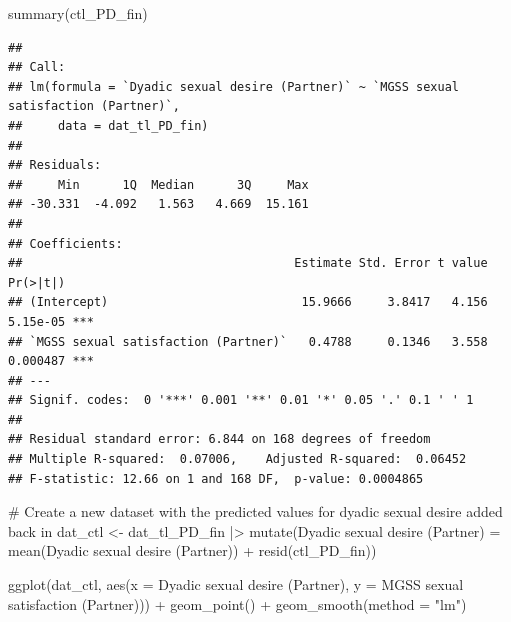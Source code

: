 \documentclass[
  bookmarksnumbered]{article}
\newenvironment{Shaded}{\begin{snugshade}}{\end{snugshade}}
\newcommand{\AttributeTok}[1]{\textcolor[rgb]{0.80,0.80,0.80}{#1}}
\newcommand{\CommentTok}[1]{\textcolor[rgb]{0.50,0.62,0.50}{#1}}
\newcommand{\FunctionTok}[1]{\textcolor[rgb]{0.94,0.94,0.56}{#1}}
\newcommand{\NormalTok}[1]{\textcolor[rgb]{0.80,0.80,0.80}{#1}}
\newcommand{\OtherTok}[1]{\textcolor[rgb]{0.94,0.94,0.56}{#1}}
\newcommand{\SpecialCharTok}[1]{\textcolor[rgb]{0.86,0.64,0.64}{#1}}
\newcommand{\StringTok}[1]{\textcolor[rgb]{0.80,0.58,0.58}{#1}}
\begin{document}
\begin{Shaded}
\begin{Highlighting}[]
\FunctionTok{summary}\NormalTok{(ctl\_PD\_fin)}
\end{Highlighting}
\end{Shaded}

\begin{verbatim}
## 
## Call:
## lm(formula = `Dyadic sexual desire (Partner)` ~ `MGSS sexual satisfaction (Partner)`, 
##     data = dat_tl_PD_fin)
## 
## Residuals:
##     Min      1Q  Median      3Q     Max 
## -30.331  -4.092   1.563   4.669  15.161 
## 
## Coefficients:
##                                      Estimate Std. Error t value Pr(>|t|)    
## (Intercept)                           15.9666     3.8417   4.156 5.15e-05 ***
## `MGSS sexual satisfaction (Partner)`   0.4788     0.1346   3.558 0.000487 ***
## ---
## Signif. codes:  0 '***' 0.001 '**' 0.01 '*' 0.05 '.' 0.1 ' ' 1
## 
## Residual standard error: 6.844 on 168 degrees of freedom
## Multiple R-squared:  0.07006,    Adjusted R-squared:  0.06452 
## F-statistic: 12.66 on 1 and 168 DF,  p-value: 0.0004865
\end{verbatim}

\begin{Shaded}
\begin{Highlighting}[]
\CommentTok{\# Create a new dataset with the predicted values for dyadic sexual desire added back in}
\NormalTok{dat\_ctl }\OtherTok{\textless{}{-}}\NormalTok{ dat\_tl\_PD\_fin }\SpecialCharTok{|\textgreater{}}
  \FunctionTok{mutate}\NormalTok{(}\StringTok{\textasciigrave{}}\AttributeTok{Dyadic sexual desire (Partner)}\StringTok{\textasciigrave{}} \OtherTok{=} \FunctionTok{mean}\NormalTok{(}\StringTok{\textasciigrave{}}\AttributeTok{Dyadic sexual desire (Partner)}\StringTok{\textasciigrave{}}\NormalTok{) }\SpecialCharTok{+}
           \FunctionTok{resid}\NormalTok{(ctl\_PD\_fin))}

\FunctionTok{ggplot}\NormalTok{(dat\_ctl, }\FunctionTok{aes}\NormalTok{(}\AttributeTok{x =} \StringTok{\textasciigrave{}}\AttributeTok{Dyadic sexual desire (Partner)}\StringTok{\textasciigrave{}}\NormalTok{, }\AttributeTok{y =} \StringTok{\textasciigrave{}}\AttributeTok{MGSS sexual satisfaction (Partner)}\StringTok{\textasciigrave{}}\NormalTok{)) }\SpecialCharTok{+}
  \FunctionTok{geom\_point}\NormalTok{() }\SpecialCharTok{+}
  \FunctionTok{geom\_smooth}\NormalTok{(}\AttributeTok{method =} \StringTok{"lm"}\NormalTok{)}
\end{Highlighting}
\end{Shaded}
\end{document}
